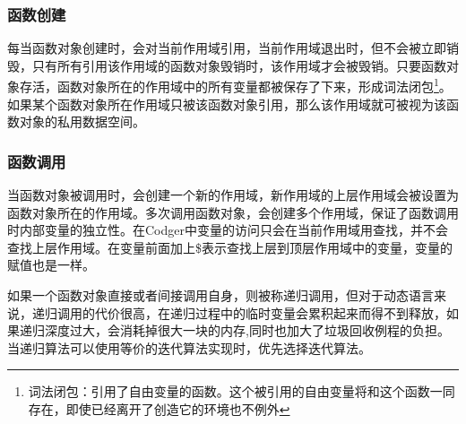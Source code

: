 \documentclass[a4paper,10pt]{article}
\begin{document}
\begin{CJK}{UTF8}{gbsn}
\subsubsection{函数创建}
每当函数对象创建时，会对当前作用域引用，当前作用域退出时，但不会被立即销毁，只有所有引用该作用域的函数对象毁销时，该作用域才会被毁销。只要函数对象存活，函数对象所在的作用域中的所有变量都被保存了下来，形成词法闭包\footnote{词法闭包：引用了自由变量的函数。这个被引用的自由变量将和这个函数一同存在，即使已经离开了创造它的环境也不例外}。如果某个函数对象所在作用域只被该函数对象引用，那么该作用域就可被视为该函数对象的私用数据空间。
\subsubsection{函数调用}
当函数对象被调用时，会创建一个新的作用域，新作用域的上层作用域会被设置为函数对象所在的作用域。多次调用函数对象，会创建多个作用域，保证了函数调用时内部变量的独立性。在Codger中变量的访问只会在当前作用域用查找，并不会查找上层作用域。在变量前面加上\$表示查找上层到顶层作用域中的变量，变量的赋值也是一样。

如果一个函数对象直接或者间接调用自身，则被称递归调用，但对于动态语言来说，递归调用的代价很高，在递归过程中的临时变量会累积起来而得不到释放，如果递归深度过大，会消耗掉很大一块的内存,同时也加大了垃圾回收例程的负担。当递归算法可以使用等价的迭代算法实现时，优先选择迭代算法。

\end{CJK}
\end{document}
